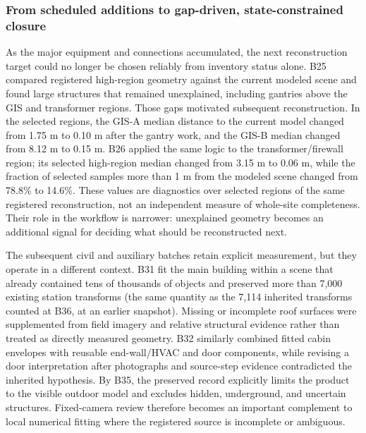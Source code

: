 \documentclass[10pt,a4paper]{article}
\begin{document}
\hypertarget{from-scheduled-additions-to-gap-driven-state-constrained-closure}{%
\subsubsection{From scheduled additions to gap-driven, state-constrained
closure}\label{from-scheduled-additions-to-gap-driven-state-constrained-closure}}

As the major equipment and connections accumulated, the next
reconstruction target could no longer be chosen reliably from inventory
status alone. B25 compared registered high-region geometry against the
current modeled scene and found large structures that remained
unexplained, including gantries above the GIS and transformer regions.
Those gaps motivated subsequent reconstruction. In the selected regions,
the GIS-A median distance to the current model changed from 1.75 m to
0.10 m after the gantry work, and the GIS-B median changed from 8.12 m
to 0.15 m. B26 applied the same logic to the transformer/firewall
region; its selected high-region median changed from 3.15 m to 0.06 m,
while the fraction of selected samples more than 1 m from the modeled
scene changed from 78.8\% to 14.6\%. These values are diagnostics over
selected regions of the same registered reconstruction, not an
independent measure of whole-site completeness. Their role in the
workflow is narrower: unexplained geometry becomes an additional signal
for deciding what should be reconstructed next.

The subsequent civil and auxiliary batches retain explicit measurement,
but they operate in a different context. B31 fit the main building
within a scene that already contained tens of thousands of objects and
preserved more than 7,000 existing station transforms (the same quantity
as the 7,114 inherited transforms counted at B36, at an earlier
snapshot). Missing or incomplete roof surfaces were supplemented from
field imagery and relative structural evidence rather than treated as
directly measured geometry. B32 similarly combined fitted cabin
envelopes with reusable end-wall/HVAC and door components, while
revising a door interpretation after photographs and source-step
evidence contradicted the inherited hypothesis. By B35, the preserved
record explicitly limits the product to the visible outdoor model and
excludes hidden, underground, and uncertain structures. Fixed-camera
review therefore becomes an important complement to local numerical
fitting where the registered source is incomplete or ambiguous.
\end{document}
